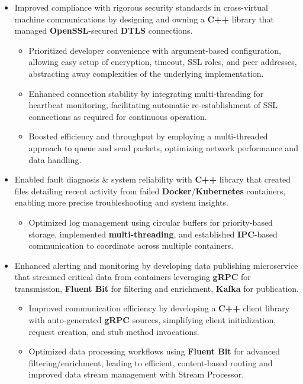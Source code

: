 \documentclass[a4paper]{article}
\begin{document}
\begin{itemize}
	\item Improved compliance with rigorous security standards in cross-virtual machine communications by designing and owning a \textbf{C++} library that managed \textbf{OpenSSL}-secured \textbf{DTLS} connections.
        \begin{itemize}
	        \item Prioritized developer convenience with argument-based configuration, allowing easy setup of encryption, timeout, SSL roles, and peer addresses, abstracting away complexities of the underlying implementation.
	        \item Enhanced connection stability by integrating multi-threading for heartbeat monitoring, facilitating automatic re-establishment of SSL connections as required for continuous operation.
	        \item Boosted efficiency and throughput by employing a multi-threaded approach to queue and send packets, optimizing network performance and data handling.
        \end{itemize}
	\item Enabled fault diagnosis \& system reliability with \textbf{C++} library that created files detailing recent activity from failed \textbf{Docker}/\textbf{Kubernetes} containers, enabling more precise troubleshooting and system insights.
        \begin{itemize}
	        \item Optimized log management using circular buffers for priority-based storage, implemented \textbf{multi-threading}, and established \textbf{IPC}-based communication to coordinate across multiple containers.
        \end{itemize}
	\item Enhanced alerting and monitoring by developing data publishing microservice that streamed critical data from containers leveraging \textbf{gRPC} for transmission, \textbf{Fluent Bit} for filtering and enrichment, \textbf{Kafka} for publication.
        \begin{itemize}
	        \item Improved communication efficiency by developing a \textbf{C++} client library with auto-generated \textbf{gRPC} sources, simplifying client initialization, request creation, and stub method invocations.
	        \item Optimized data processing workflows using \textbf{Fluent Bit} for advanced filtering/enrichment, leading to efficient, content-based routing and improved data stream management with Stream Processor.

\end{itemize}
\end{itemize}
\end{document}
